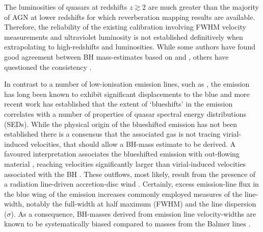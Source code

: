 The luminosities of quasars at redshifts $z\gtrsim 2$ are much greater than the majority of AGN at lower redshifts for which reverberation mapping results are available.  
Therefore, the reliability of the existing calibration involving  FWHM velocity measurements and ultraviolet luminosity is not established definitively when extrapolating to high-redshifts and luminosities. 
While some authors have found good agreement between BH mass-estimates based on  and \hb \citep[e.g.][]{vestergaard06, assef11, tilton13}, others have questioned the consistency \citep[e.g.][]{baskin05,trakhtenbrot12,shen12}.  

In contrast to a number of low-ionisation emission lines, such as , the  emission has long been known to exhibit significant displacements to the blue \citep{gaskell82} and more recent work \citep[e.g.][]{sulentic00a, richards11} has established that the extent of `blueshifts' in the  emission correlates with a number of properties of quasar spectral energy distributions (SEDs). 
While the physical origin of the blueshifted emission has not been established there is a consensus that the associated gas is not tracing virial-induced velocities, that should allow a BH-mass estimate to be derived.  
A favoured interpretation associates the blueshifted emission with out-flowing material \citep[see][for a recent review]{netzer15}, reaching velocities significantly larger than virial-induced velocities associated with the BH \citep[e.g.][]{sulentic07, richards11}.
These outflows, most likely, result from the presence of a radiation line-driven accretion-disc wind \citep[e.g.][]{konigl94, murray95, proga00, everett05, gallagher15}.  
Certainly, excess emission-line flux in the blue wing of the  emission increases commonly employed measures of the line-width, notably the full-width at half maximum (FWHM) and the line dispersion ($\sigma$). 
As a consequence, BH-masses derived from  emission line velocity-widths are known to be systematically biased compared to masses from the Balmer lines \citep[e.g.][]{shen08,shen12}. 

